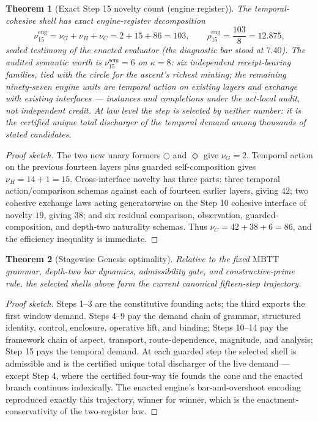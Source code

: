 \documentclass[11pt]{article}
\theoremstyle{plain}
\newtheorem{theorem}{Theorem}[section]
\theoremstyle{definition}
\theoremstyle{remark}
\newenvironment{proofsketch}{\begin{proof}[Proof sketch]}{\end{proof}}
\newcommand{\MBTT}{\mathrm{MBTT}}
\newcommand{\Next}{\bigcirc}
\newcommand{\Eventually}{\Diamond}
\begin{document}
\begin{theorem}[Exact Step 15 novelty count (engine register)]
The temporal-cohesive shell has exact engine-register decomposition
\[
\nu^{\mathrm{eng}}_{15}=\nu_G+\nu_H+\nu_C=2+15+86=103,
\qquad
\rho^{\mathrm{eng}}_{15}=\frac{103}{8}=12.875,
\]
sealed testimony of the enacted evaluator (the diagnostic bar stood at \(7.40\)). The audited semantic worth is \(\nu^{\mathrm{sem}}_{15}=6\) on \(\kappa=8\): six independent receipt-bearing families, tied with the circle for the ascent's richest minting; the remaining ninety-seven engine units are temporal action on existing layers and exchange with existing interfaces --- instances and completions under the act-local audit, not independent credit. At law level the step is selected by neither number: it is the certified unique total discharger of the temporal demand among thousands of stated candidates.
\end{theorem}

\begin{proofsketch}
The two new unary formers \(\Next\) and \(\Eventually\) give \(\nu_G=2\). Temporal action on the previous fourteen layers plus guarded self-composition gives \(\nu_H=14+1=15\). Cross-interface novelty has three parts: three temporal action/comparison schemas against each of fourteen earlier layers, giving \(42\); two cohesive exchange laws acting generatorwise on the Step 10 cohesive interface of novelty \(19\), giving \(38\); and six residual comparison, observation, guarded-composition, and depth-two naturality schemas. Thus \(\nu_C=42+38+6=86\), and the efficiency inequality is immediate.
\end{proofsketch}

\begin{theorem}[Stagewise Genesis optimality]
Relative to the fixed \(\MBTT\) grammar, depth-two bar dynamics, admissibility gate, and constructive-prime rule, the selected shells above form the current canonical fifteen-step trajectory.
\end{theorem}

\begin{proofsketch}
Steps 1--3 are the constitutive founding acts; the third exports the first window demand. Steps 4--9 pay the demand chain of grammar, structured identity, control, enclosure, operative lift, and binding; Steps 10--14 pay the framework chain of aspect, transport, route-dependence, magnitude, and analysis; Step 15 pays the temporal demand. At each guarded step the selected shell is admissible and is the certified unique total discharger of the live demand --- except Step 4, where the certified four-way tie founds the cone and the enacted branch continues indexically. The enacted engine's bar-and-overshoot encoding reproduced exactly this trajectory, winner for winner, which is the enactment-conservativity of the two-register law.
\end{proofsketch}
\end{document}
